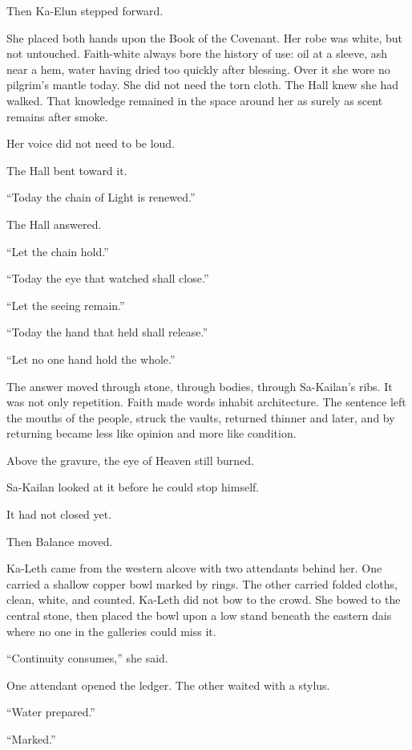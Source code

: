 Then Ka-Elun stepped forward.\par
She placed both hands upon the Book of the Covenant.
Her robe was white, but not untouched.
Faith-white always bore the history of use: oil at a sleeve, ash near a hem, water having dried too quickly after blessing.
Over it she wore no pilgrim’s mantle today.
She did not need the torn cloth.
The Hall knew she had walked.
That knowledge remained in the space around her as surely as scent remains after smoke.\par
Her voice did not need to be loud.\par
The Hall bent toward it.\par
“Today the chain of Light is renewed.”\par
The Hall answered.\par
“Let the chain hold.”\par
“Today the eye that watched shall close.”\par
“Let the seeing remain.”\par
“Today the hand that held shall release.”\par
“Let no one hand hold the whole.”\par
The answer moved through stone, through bodies, through Sa-Kailan’s ribs.
It was not only repetition.
Faith made words inhabit architecture.
The sentence left the mouths of the people, struck the vaults, returned thinner and later, and by returning became less like opinion and more like condition.\par
Above the gravure, the eye of Heaven still burned.\par
Sa-Kailan looked at it before he could stop himself.\par
It had not closed yet.\par
Then Balance moved.\par
Ka-Leth came from the western alcove with two attendants behind her.
One carried a shallow copper bowl marked by rings.
The other carried folded cloths, clean, white, and counted.
Ka-Leth did not bow to the crowd.
She bowed to the central stone, then placed the bowl upon a low stand beneath the eastern dais where no one in the galleries could miss it.\par
“Continuity consumes,” she said.\par
One attendant opened the ledger.
The other waited with a stylus.\par
“Water prepared.”\par
“Marked.”\par
